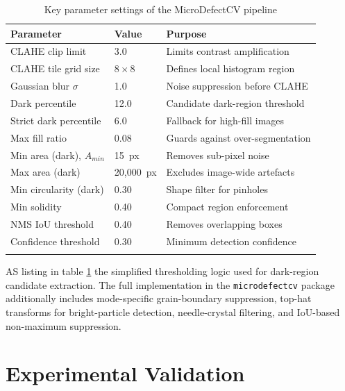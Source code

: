 \documentclass[pdflatex,sn-mathphys-num,iicol]{sn-jnl}
\theoremstyle{thmstyleone}
\theoremstyle{thmstyletwo}
\theoremstyle{thmstylethree}
\begin{document}
\begin{table}[!htbp]
\caption{Key parameter settings of the MicroDefectCV pipeline}
\label{tab:parameters}
\renewcommand{\arraystretch}{0.85}
\begin{tabular}{@{}llp{6cm}@{}}
\toprule
Parameter & Value & Purpose \\
\midrule
CLAHE clip limit          & 3.0        & Limits contrast amplification \\
CLAHE tile grid size      & $8\times8$ & Defines local histogram region \\
Gaussian blur $\sigma$    & 1.0        & Noise suppression before CLAHE \\
Dark percentile           & 12.0       & Candidate dark-region threshold \\
Strict dark percentile    & 6.0        & Fallback for high-fill images \\
Max fill ratio            & 0.08       & Guards against over-segmentation \\
Min area (dark), $A_{min}$& 15~px      & Removes sub-pixel noise \\
Max area (dark)           & 20{,}000~px& Excludes image-wide artefacts \\
Min circularity (dark)    & 0.30       & Shape filter for pinholes \\
Min solidity              & 0.40       & Compact region enforcement \\
NMS IoU threshold         & 0.40       & Removes overlapping boxes \\
Confidence threshold      & 0.30       & Minimum detection confidence \\
\botrule
\end{tabular}
\end{table}

AS listing in table \ref{tab:parameters} the simplified thresholding
logic used for dark-region candidate extraction. The full
implementation in the \texttt{microdefectcv} package additionally
includes mode-specific grain-boundary suppression, top-hat
transforms for bright-particle detection, needle-crystal filtering,
and IoU-based non-maximum suppression.


\section{Experimental Validation}\label{sec:validation}
\end{document}
